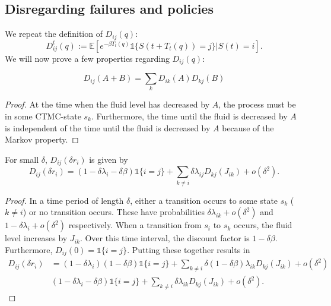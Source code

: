 \subsection{Disregarding failures and policies}
We repeat the definition of $D_{ij}(q)$:
\[
D_{ij}^t(q):=\mathbb{E}[e^{-\beta T_t(q)}\mathds{1}\{S(t+T_t(q))=j\}|S(t)=i].
\]
We will now prove a few properties regarding $D_{ij}(q)$:
\begin{lemma}\label{lemma:MmfmDiscountsExponentLinear}
	\[
	D_{ij}(A+B)=\sum\limits_k D_{ik}(A)D_{kj}(B)
	\]
	\begin{proof}
		At the time when the fluid level has decreased by $A$, the process must be in some CTMC-state $s_k$.
		Furthermore, the time until the fluid is decreased by $A$ is independent of the time until the fluid is decreased by $A$ because of the Markov property.
	\end{proof}
\end{lemma}
\begin{lemma}\label{lemma:MmfmDiscountsInfinitisimal}
	For small $\delta$, $D_{ij}(\delta r_i)$ is given by
	\[
	D_{ij}(\delta r_i)=(1-\delta\lambda_i-\delta\beta)\mathds{1}\{i=j\}+\sum\limits_{k\neq i}\delta\lambda_{ij}D_{kj}(J_{ik})+o(\delta^2).
	\]
	\begin{proof}
		In a time period of length $\delta$, either a transition occurs to some state $s_k$ ($k\neq i$) or no transition occurs.
		These have probabilities $\delta\lambda_{ik}+o(\delta^2)$ and $1-\delta\lambda_i+o(\delta^2)$ respectively.
		When a transition from $s_i$ to $s_k$ occurs, the fluid level increases by $J_{ik}$.
		Over this time interval, the discount factor is $1-\delta\beta$.
		Furthermore, $D_{ij}(0)=\mathds{1}\{i=j\}$.
		Putting these together results in
		\[
		\begin{split}
		D_{ij}(\delta r_i)&=(1-\delta\lambda_i)(1-\delta\beta)\mathds{1}\{i=j\}+\sum\limits_{k\neq i}\delta(1-\delta\beta)\lambda_{ik}D_{kj}(J_{ik})+o(\delta^2)\\
		&(1-\delta\lambda_i-\delta\beta)\mathds{1}\{i=j\}+\sum\limits_{k\neq i}\delta\lambda_{ik}D_{kj}(J_{ik})+o(\delta^2).
		\end{split}
		\]
	\end{proof}
\end{lemma}
